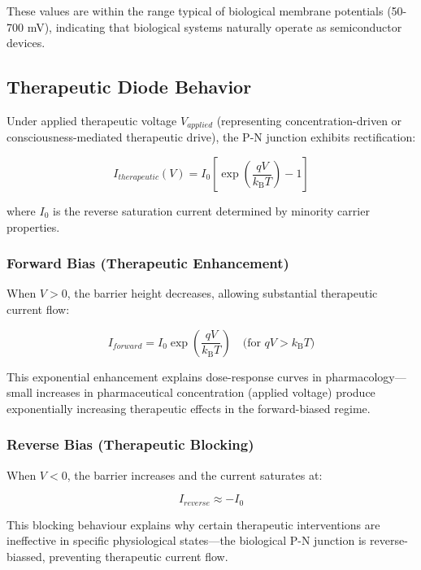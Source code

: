 \documentclass{article}
\newcommand{\kB}{k_\mathrm{B}}
\theoremstyle{definition}
\theoremstyle{remark}
\begin{document}
These values are within the range typical of biological membrane potentials (50-700 mV), indicating that biological systems naturally operate as semiconductor devices.

\subsection{Therapeutic Diode Behavior}

Under applied therapeutic voltage $V_{applied}$ (representing concentration-driven or consciousness-mediated therapeutic drive), the P-N junction exhibits rectification:

\begin{equation}
I_{therapeutic}(V) = I_0 \left[\exp\left(\frac{qV}{\kB T}\right) - 1\right]
\label{eq:diode_equation}
\end{equation}

where $I_0$ is the reverse saturation current determined by minority carrier properties.

\subsubsection{Forward Bias (Therapeutic Enhancement)}

When $V > 0$, the barrier height decreases, allowing substantial therapeutic current flow:

\begin{equation}
I_{forward} = I_0 \exp\left(\frac{qV}{\kB T}\right) \quad \text{(for } qV > \kB T\text{)}
\end{equation}

This exponential enhancement explains dose-response curves in pharmacology—small increases in pharmaceutical concentration (applied voltage) produce exponentially increasing therapeutic effects in the forward-biased regime.

\subsubsection{Reverse Bias (Therapeutic Blocking)}

When $V < 0$, the barrier increases and the current saturates at:

\begin{equation}
I_{reverse} \approx -I_0
\end{equation}

This blocking behaviour explains why certain therapeutic interventions are ineffective in specific physiological states—the biological P-N junction is reverse-biassed, preventing therapeutic current flow.
\end{document}

